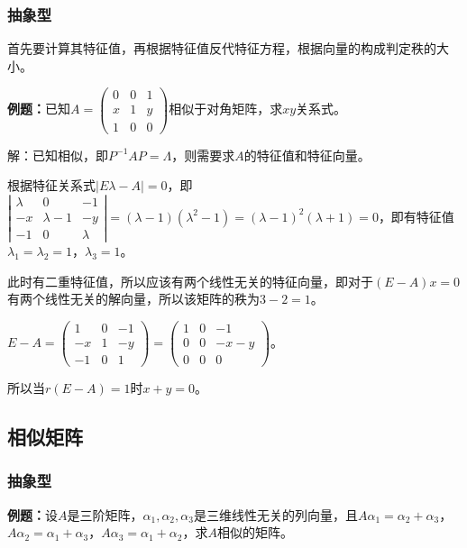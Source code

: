 \documentclass[UTF8, 12pt]{ctexart}
\begin{document}
\subsubsection{抽象型}

首先要计算其特征值，再根据特征值反代特征方程，根据向量的构成判定秩的大小。

\textbf{例题：}已知$A=\left(\begin{array}{ccc}
    0 & 0 & 1 \\
    x & 1 & y \\
    1 & 0 & 0
\end{array}\right)$相似于对角矩阵，求$xy$关系式。

解：已知相似，即$P^{-1}AP=\Lambda$，则需要求$A$的特征值和特征向量。

根据特征关系式$\vert E\lambda-A\vert=0$，即$\left\vert\begin{array}{ccc}
    \lambda & 0 & -1 \\
    -x & \lambda-1 & -y \\
    -1 & 0 & \lambda
\end{array}\right\vert=(\lambda-1)(\lambda^2-1)=(\lambda-1)^2(\lambda+1)=0$，即有特征值$\lambda_1=\lambda_2=1$，$\lambda_3=1$。

此时有二重特征值，所以应该有两个线性无关的特征向量，即对于$(E-A)x=0$有两个线性无关的解向量，所以该矩阵的秩为$3-2=1$。

$E-A=\left(\begin{array}{ccc}
    1 & 0 & -1 \\
    -x & 1 & -y \\
    -1 & 0 & 1
\end{array}\right)=\left(\begin{array}{ccc}
    1 & 0 & -1 \\
    0 & 0 & -x-y \\
    0 & 0 & 0
\end{array}\right)$。

所以当$r(E-A)=1$时$x+y=0$。

\subsection{相似矩阵}

\subsubsection{抽象型}

\textbf{例题：}设$A$是三阶矩阵，$\alpha_1,\alpha_2,\alpha_3$是三维线性无关的列向量，且$A\alpha_1=\alpha_2+\alpha_3$，$A\alpha_2=\alpha_1+\alpha_3$，$A\alpha_3=\alpha_1+\alpha_2$，求$A$相似的矩阵。
\end{document}
